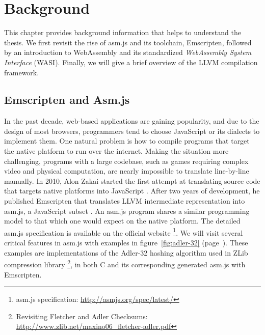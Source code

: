 \chapter{Background}

This chapter provides background information that helps to understand the
thesis. We first revisit the rise of asm.js and its toolchain, Emscripten,
followed by an introduction to WebAssembly and its standardized
\emph{WebAssembly System Interface} (WASI). Finally, we will give a brief
overview of the LLVM compilation framework.

\section{Emscripten and Asm.js}

In the past decade, web-based applications are gaining popularity, and due to
the design of most browsers, programmers tend to choose JavaScript or its
dialects to implement them. One natural problem is how to compile programs that
target the native platform to run over the internet. Making the situation more
challenging, programs with a large codebase, such as games requiring
complex video and physical computation, are nearly impossible to translate
line-by-line manually. In 2010, Alon Zakai started the first attempt at
translating source code that targets native platforms into JavaScript
\cite{8118483}. After two years of development, he published Emscripten that
translates LLVM intermediate representation into asm.js, a JavaScript subset
\cite{10.1145/2048147.2048224}. An asm.js program shares a similar programming
model to that which one would expect on the native platform. The detailed asm.js
specification is available on the official website
\footnote{asm.js specification: \url{http://asmjs.org/spec/latest/}}.
We will visit several critical features in asm.js with examples in
figure~\ref{fig:adler-32} (page~\pageref{fig:adler-32}). These examples are
implementations of the Adler-32 hashing algorithm used in ZLib compression
library \cite{adler32-paper} \footnote{Revisiting Fletcher and Adler Checksums:
  \\\url{http://www.zlib.net/maxino06\_fletcher-adler.pdf}}, in both C and its
corresponding generated asm.js with Emscripten.

